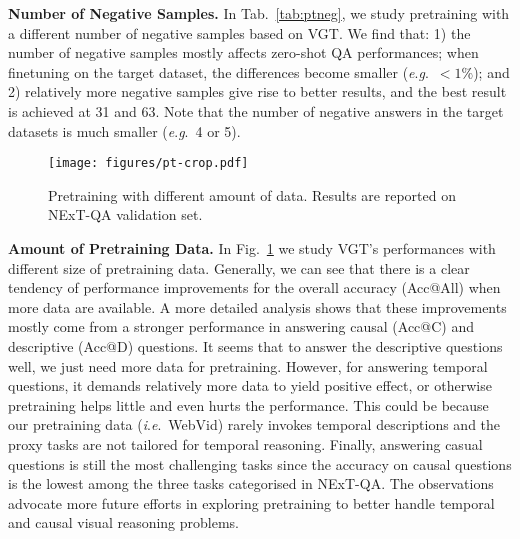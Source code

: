 \documentclass[10pt,journal,compsoc]{IEEEtran}
\newcommand{\ie}{\textit{i}.\textit{e}.}
\newcommand{\eg}{\textit{e}.\textit{g}.}
\begin{document}
\setlength{\tabcolsep}{8pt}
\begin{table}[t!]
    \small
    \centering
    \caption{Contrastive pretraining with a different number of negative samples. Results are reported on NExT-QA test set.}
    \label{tab:ptneg}
    \vspace{-0.5em}
    \vspace{-0.4cm}
\end{table}
\textbf{Number of Negative Samples.}
In Tab.~\ref{tab:ptneg}, we study pretraining with a different number of negative samples based on VGT. We find that:
1) the number of negative samples mostly affects zero-shot QA performances; when finetuning on the target dataset, the differences become smaller (\eg~$<1\%$); and
2) relatively more negative samples give rise to better results, and the best result is achieved at 31 and 63. Note that the number of negative answers in the target datasets is much smaller (\eg~4 or 5).
\begin{figure}[t!]
  \begin{center}
    \texttt{[image: figures/pt-crop.pdf]}
  \end{center}
  \vspace{-1em}
  \caption{Pretraining with different amount of data. Results are reported on NExT-QA validation set.}
  \label{fig:pts}
\end{figure}

\textbf{Amount of Pretraining Data.}
In Fig.~\ref{fig:pts} we study VGT's performances with different size of pretraining data. Generally, we can see that there is a clear tendency of performance improvements for the overall accuracy (Acc@All) when more data are available. A more detailed analysis shows that these improvements mostly come from a stronger performance in answering causal (Acc@C) and descriptive (Acc@D) questions. It seems that to answer the descriptive questions well, we just need more data for pretraining. However, for answering temporal questions, it demands relatively more data to yield positive effect, or otherwise pretraining helps little and even hurts the performance. This could be because our pretraining data (\ie~WebVid) rarely invokes temporal descriptions and the proxy tasks are not tailored for temporal reasoning. 
Finally, answering casual questions is still the most challenging tasks since the accuracy on causal questions is the lowest among the three tasks categorised in NExT-QA. The observations advocate more future efforts in exploring pretraining to better handle temporal and causal visual reasoning problems.
\end{document}
